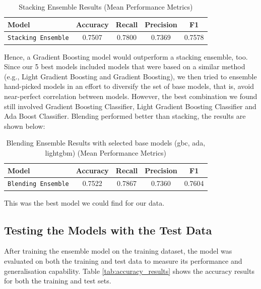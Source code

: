 \documentclass[a4paper,12pt]{article}
\begin{document}
\begin{table}[H]
    \centering
    \begin{tabular}{l c c c c}
    \toprule
    \textbf{Model} & \textbf{Accuracy} & \textbf{Recall} & \textbf{Precision} & \textbf{F1} \\
    \midrule
    \texttt{Stacking Ensemble} & 0.7507 & 0.7800 & 0.7369 & 0.7578 \\
    \bottomrule
    \end{tabular}
    \caption{Stacking Ensemble Results (Mean Performance Metrics)}
    \label{tab:stacking_performance}
\end{table}
    
Hence, a Gradient Boosting model would outperform a stacking ensemble, too.
Since our 5 best models included models that were based on a similar method (e.g., Light Gradient Boosting 
and Gradient Boosting), we then tried to ensemble hand-picked models in an effort to diversify the set of
base models, that is, avoid near-perfect correlation between models. However, the best combination we found still 
involved Gradient Boosting Classifier, Light Gradient Boosting Classifier and Ada Boost Classifier.
Blending performed better than stacking, the results are shown below:

\begin{table}[H]
    \centering
    \begin{tabular}{l c c c c}
    \toprule
    \textbf{Model} & \textbf{Accuracy} & \textbf{Recall} & \textbf{Precision} & \textbf{F1} \\
    \midrule
    \texttt{Blending Ensemble} & 0.7522 & 0.7867 & 0.7360 & 0.7604 \\
    \bottomrule
    \end{tabular}
    \caption{Blending Ensemble Results with selected base models (gbc, ada, lightgbm) (Mean Performance Metrics)}
    \label{tab:blending_performance_handpicked}
\end{table}

This was the best model we could find for our data.


\subsection{Testing the Models with the Test Data}

After training the ensemble model on the training dataset, the model was evaluated on both the 
training and test data to measure its performance and generalisation capability. 
Table \ref{tab:accuracy_results} shows the accuracy results for both the training and test sets.
\end{document}

